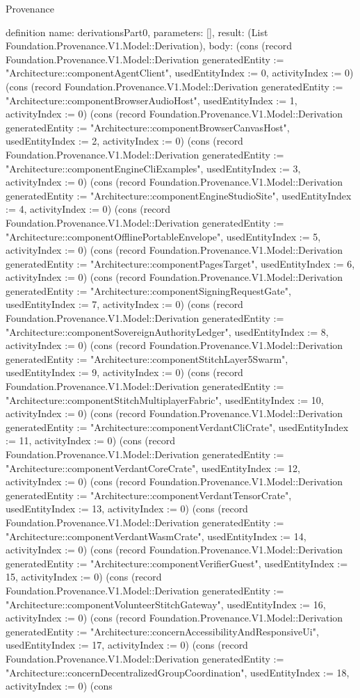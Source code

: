 \begin{lexlean}{Provenance}
\begin{semanticmodule}
definition{
  name: derivationsPart0,
  parameters: [],
  result: (List Foundation.Provenance.V1.Model::Derivation),
  body: (cons (record Foundation.Provenance.V1.Model::Derivation {generatedEntity := "Architecture::componentAgentClient", usedEntityIndex := 0, activityIndex := 0}) (cons (record Foundation.Provenance.V1.Model::Derivation {generatedEntity := "Architecture::componentBrowserAudioHost", usedEntityIndex := 1, activityIndex := 0}) (cons (record Foundation.Provenance.V1.Model::Derivation {generatedEntity := "Architecture::componentBrowserCanvasHost", usedEntityIndex := 2, activityIndex := 0}) (cons (record Foundation.Provenance.V1.Model::Derivation {generatedEntity := "Architecture::componentEngineCliExamples", usedEntityIndex := 3, activityIndex := 0}) (cons (record Foundation.Provenance.V1.Model::Derivation {generatedEntity := "Architecture::componentEngineStudioSite", usedEntityIndex := 4, activityIndex := 0}) (cons (record Foundation.Provenance.V1.Model::Derivation {generatedEntity := "Architecture::componentOfflinePortableEnvelope", usedEntityIndex := 5, activityIndex := 0}) (cons (record Foundation.Provenance.V1.Model::Derivation {generatedEntity := "Architecture::componentPagesTarget", usedEntityIndex := 6, activityIndex := 0}) (cons (record Foundation.Provenance.V1.Model::Derivation {generatedEntity := "Architecture::componentSigningRequestGate", usedEntityIndex := 7, activityIndex := 0}) (cons (record Foundation.Provenance.V1.Model::Derivation {generatedEntity := "Architecture::componentSovereignAuthorityLedger", usedEntityIndex := 8, activityIndex := 0}) (cons (record Foundation.Provenance.V1.Model::Derivation {generatedEntity := "Architecture::componentStitchLayer5Swarm", usedEntityIndex := 9, activityIndex := 0}) (cons (record Foundation.Provenance.V1.Model::Derivation {generatedEntity := "Architecture::componentStitchMultiplayerFabric", usedEntityIndex := 10, activityIndex := 0}) (cons (record Foundation.Provenance.V1.Model::Derivation {generatedEntity := "Architecture::componentVerdantCliCrate", usedEntityIndex := 11, activityIndex := 0}) (cons (record Foundation.Provenance.V1.Model::Derivation {generatedEntity := "Architecture::componentVerdantCoreCrate", usedEntityIndex := 12, activityIndex := 0}) (cons (record Foundation.Provenance.V1.Model::Derivation {generatedEntity := "Architecture::componentVerdantTensorCrate", usedEntityIndex := 13, activityIndex := 0}) (cons (record Foundation.Provenance.V1.Model::Derivation {generatedEntity := "Architecture::componentVerdantWasmCrate", usedEntityIndex := 14, activityIndex := 0}) (cons (record Foundation.Provenance.V1.Model::Derivation {generatedEntity := "Architecture::componentVerifierGuest", usedEntityIndex := 15, activityIndex := 0}) (cons (record Foundation.Provenance.V1.Model::Derivation {generatedEntity := "Architecture::componentVolunteerStitchGateway", usedEntityIndex := 16, activityIndex := 0}) (cons (record Foundation.Provenance.V1.Model::Derivation {generatedEntity := "Architecture::concernAccessibilityAndResponsiveUi", usedEntityIndex := 17, activityIndex := 0}) (cons (record Foundation.Provenance.V1.Model::Derivation {generatedEntity := "Architecture::concernDecentralizedGroupCoordination", usedEntityIndex := 18, activityIndex := 0}) (cons }
\end{semanticmodule}
\end{lexlean}
